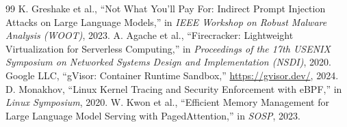\documentclass[11pt,a4paper]{article}
\begin{document}
\begin{thebibliography}{99}
 K. Greshake et al., ``Not What You'll Pay For: Indirect Prompt Injection Attacks on Large Language Models,'' in \emph{IEEE Workshop on Robust Malware Analysis (WOOT)}, 2023.
 A. Agache et al., ``Firecracker: Lightweight Virtualization for Serverless Computing,'' in \emph{Proceedings of the 17th USENIX Symposium on Networked Systems Design and Implementation (NSDI)}, 2020.
 Google LLC, ``gVisor: Container Runtime Sandbox,'' \url{https://gvisor.dev/}, 2024.
 D. Monakhov, ``Linux Kernel Tracing and Security Enforcement with eBPF,'' in \emph{Linux Symposium}, 2020.
 W. Kwon et al., ``Efficient Memory Management for Large Language Model Serving with PagedAttention,'' in \emph{SOSP}, 2023.
\end{thebibliography}
\end{document}
